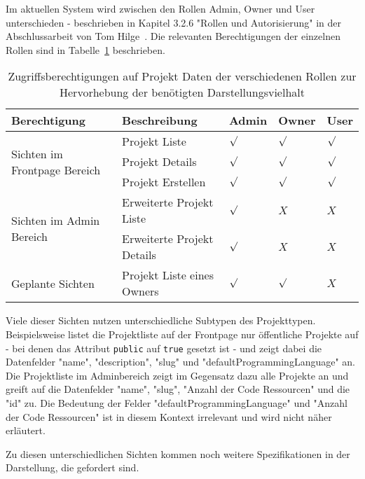 Im aktuellen System wird zwischen den Rollen Admin, Owner und User unterschieden - beschrieben in Kapitel 3.2.6 "Rollen und Autorisierung"
in der Abschlussarbeit von Tom Hilge~\cite{Abschlussarbeit-Tom-Hilge}.
Die relevanten Berechtigungen der einzelnen Rollen sind in Tabelle~\ref{tbl:req:roles} beschrieben.

\begin{table}[h!]
    \begin{tabular}{|p{}|p{}|p{}|p{}|p{}|}
        \hline
        \textbf{Berechtigung} & \textbf{Beschreibung} & \textbf{Admin} & \textbf{Owner} & \textbf{User} \\ \hline
        \multirow{3}{*}{Sichten im Frontpage Bereich}
        & Projekt Liste & $\surd$ & $\surd$ & $\surd$\\
        & Projekt Details & $\surd$ & $\surd$ & $\surd$\\
        & Projekt Erstellen & $\surd$ & $\surd$ & $\surd$ \\
        \hline
        \multirow{2}{*}{Sichten im Admin Bereich}
        & Erweiterte Projekt Liste & $\surd$ & $X$ & $X$\\
        & Erweiterte Projekt Details & $\surd$ & $X$ & $X$\\
        \hline
        \multirow{1}{*}{Geplante Sichten}
        & Projekt Liste eines Owners & $\surd$ & $\surd$ & $X$\\
        \hline
    \end{tabular}
    \vspace{5pt}
    \caption{Zugriffsberechtigungen auf Projekt Daten der verschiedenen Rollen zur Hervorhebung der benötigten Darstellungsvielhalt}
    \label{tbl:req:roles}
\end{table}

Viele dieser Sichten nutzen unterschiedliche Subtypen des Projekttypen.
Beispielsweise listet die Projektliste auf der Frontpage nur öffentliche Projekte auf - bei denen das Attribut \texttt{public} auf \texttt{true} gesetzt ist  -
und zeigt dabei die Datenfelder "name", "description", "slug" und "defaultProgrammingLanguage" an.
Die Projektliste im Adminbereich zeigt im Gegensatz dazu alle Projekte an und greift auf
die Datenfelder "name", "slug", "Anzahl der Code Ressourcen" und die "id" zu.
Die Bedeutung der Felder "defaultProgrammingLanguage" und "Anzahl der Code Ressourcen" ist in diesem Kontext irrelevant und wird nicht näher erläutert.

Zu diesen unterschiedlichen Sichten kommen noch weitere Spezifikationen in der Darstellung, die gefordert sind.

